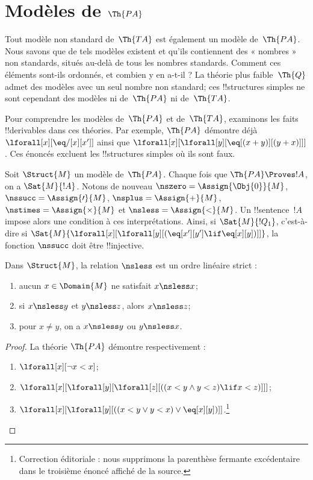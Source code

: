 \documentclass[../../../include/open-logic-section]{subfiles}
\begin{document}
\section{Modèles de $\Th{PA}$}

\begin{explain}
Tout modèle non standard de~$\Th{TA}$ est également
un modèle de~$\Th{PA}$. Nous savons que de tels
modèles existent et qu'ils contiennent des
« nombres » non standards, situés au-delà de
tous les nombres standards. Comment ces éléments
sont-ils ordonnés, et combien y en a-t-il ?
La théorie plus faible~$\Th{Q}$ admet des modèles
avec un seul nombre non standard; ces !!{structure}s
simples ne sont cependant des modèles ni
de~$\Th{PA}$ ni de~$\Th{TA}$.

Pour comprendre les modèles de~$\Th{PA}$ et
de~$\Th{TA}$, examinons les faits !!{derivable}s
dans ces théories. Par exemple, $\Th{PA}$ démontre
déjà $\lforall[x][\eq/[x][x']]$ ainsi que
$\lforall[x][\lforall[y][\eq[(x+y)][(y+x)]]]$.
Ces énoncés excluent les !!{structure}s simples
où ils sont faux.

Soit $\Struct{M}$ un modèle de~$\Th{PA}$.
Chaque fois que $\Th{PA}\Proves !A$, on a
$\Sat{M}{!A}$. Notons de nouveau
$\nszero=\Assign{\Obj{0}}{M}$,
$\nssucc=\Assign{\prime}{M}$,
$\nsplus=\Assign{+}{M}$,
$\nstimes=\Assign{\times}{M}$ et
$\nsless=\Assign{<}{M}$. Un !!{sentence}~$!A$
impose alors une condition à ces interprétations.
Ainsi, si $\Sat{M}{!Q_1}$, c'est-à-dire
si
$\Sat{M}{\lforall[x][\lforall[y][
(\eq[x'][y']\lif\eq[x][y])]]}$,
la fonction $\nssucc$ doit être !!{injective}.
\end{explain}

\begin{prop}
Dans $\Struct{M}$, la relation $\nsless$ est
un ordre linéaire strict :
\begin{enumerate}
\item aucun $x\in\Domain{M}$ ne satisfait
  $x\nsless x$;
\item si $x\nsless y$ et $y\nsless z$,
  alors $x\nsless z$;
\item pour $x\neq y$, on a
  $x\nsless y$ ou $y\nsless x$.
\end{enumerate}
\end{prop}

\begin{proof}
La théorie $\Th{PA}$ démontre respectivement :
\begin{enumerate}
\item $\lforall[x][\lnot x<x]$;
\item $\lforall[x][\lforall[y][\lforall[z][
  ((x<y\land y<z)\lif x<z)]]]$;
\item $\lforall[x][\lforall[y][
  ((x<y\lor y<x)\lor\eq[x][y])]]$.\footnote{Correction éditoriale : nous supprimons la parenthèse fermante excédentaire dans le troisième énoncé affiché de la source.}
\end{enumerate}
\end{proof}
\end{document}
